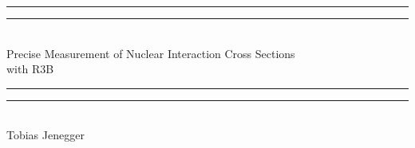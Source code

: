 \documentclass[12pt,twoside]{article}
\begin{document}
{%
  \centering %
  \vspace*{\baselineskip} %
  
  \rule{\textwidth}{1.6pt}\vspace*{-\baselineskip}\vspace*{2pt} 
  \rule{\textwidth}{0.4pt}\\[\baselineskip]
  

	{\Large Precise Measurement of Nuclear Interaction Cross Sections  \\[0.3\baselineskip] with R3B    \\[0.3\baselineskip]
	}

  \rule{\textwidth}{0.4pt}\vspace*{-\baselineskip}\vspace{3.2pt}
  \rule{\textwidth}{2pt}\\[\baselineskip] %
  
  
  {\Huge Tobias Jenegger }
  
  \vspace*{2\baselineskip} %
  
  
  \vspace*{\fill}
  
  
  
}
\end{document}
